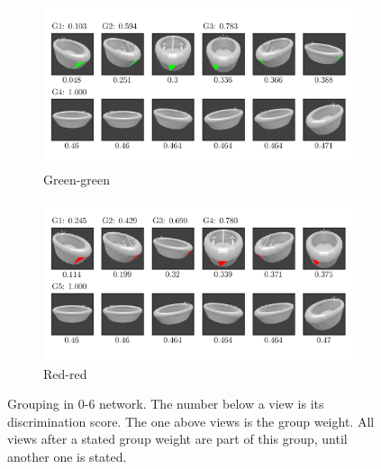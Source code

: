 \begin{figure}
	\centering
	\begin{subfigure}{\textwidth}
		\includegraphics[trim=10 20 10 20, clip]{images/mn-sl-0-6-20/bathtub_0107_4_grouping.png}
		\caption{Green-green}
		\label{fig:grouping-0-6-green-green}
	\end{subfigure}
	\begin{subfigure}{\textwidth}
		\includegraphics[trim=10 20 10 20, clip]{images/mn-sl-0-6-20/bathtub_0107_5_grouping.png}
		\caption{Red-red}
		\label{fig:grouping-0-6-red-red}
	\end{subfigure}
	\caption[Grouping in 0-6 network]{Grouping in 0-6 network. The number below a view is its discrimination score. The one above views is the group weight. All views after a stated group weight are part of this group, until another one is stated.}
	\label{fig:grouping-0-6}
\end{figure}


